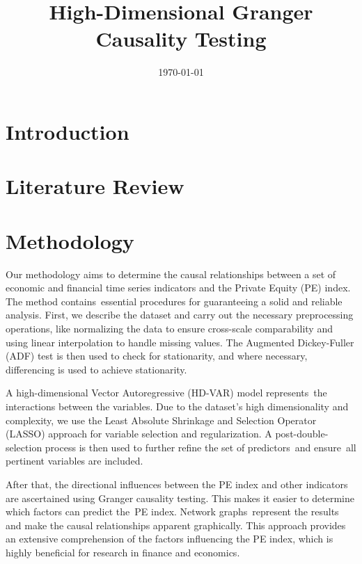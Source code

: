 \documentclass[12pt]{article}
\title{High-Dimensional Granger Causality Testing}
\date{\today}
\begin{document}
\maketitle

\begin{abstract}
\end{abstract}

\section{Introduction}

\section{Literature Review}

\section{Methodology}
Our methodology aims to determine the causal relationships between a set of economic and financial time series indicators and the Private Equity (PE) index. The method contains essential procedures for guaranteeing a solid and reliable analysis. First, we describe the dataset and carry out the necessary preprocessing operations, like normalizing the data to ensure cross-scale comparability and using linear interpolation to handle missing values. The Augmented Dickey-Fuller (ADF) test is then used to check for stationarity, and where necessary, differencing is used to achieve stationarity.

A high-dimensional Vector Autoregressive (HD-VAR) model represents the interactions between the variables. Due to the dataset's high dimensionality and complexity, we use the Least Absolute Shrinkage and Selection Operator (LASSO) approach for variable selection and regularization. A post-double-selection process is then used to further refine the set of predictors and ensure all pertinent variables are included.

After that, the directional influences between the PE index and other indicators are ascertained using Granger causality testing. This makes it easier to determine which factors can predict the PE index. Network graphs represent the results and make the causal relationships apparent graphically. This approach provides an extensive comprehension of the factors influencing the PE index, which is highly beneficial for research in finance and economics.
\end{document}
